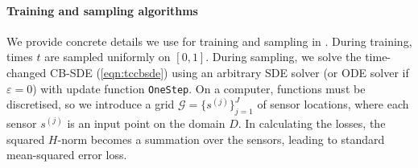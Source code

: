 \paragraph{Training and sampling algorithms}
We provide concrete details we use for training and sampling in . During training, times \(t\) are sampled uniformly on \([0, 1]\). During sampling, we solve the time-changed CB-SDE (\ref{eqn:tccbsde}) using an arbitrary SDE solver (or ODE solver if \(\varepsilon = 0\)) with update function \texttt{OneStep}. On a computer, functions must be discretised, so we introduce a grid \(\mathcal{G} = \{s^{(j)}\}_{j=1}^{J}\) of sensor locations, where each sensor \(s^{(j)}\) is an input point on the domain \(D\). In calculating the losses, the squared \(H\)-norm becomes a summation over the sensors, leading to standard mean-squared error loss.

